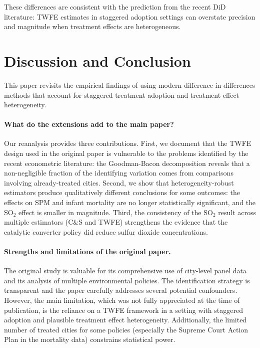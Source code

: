 \documentclass[10pt]{article}
\begin{document}
These differences are consistent with the prediction from the recent DiD literature: TWFE estimates in staggered adoption settings can overstate precision and magnitude when treatment effects are heterogeneous.

\section{Discussion and Conclusion}

This paper revisits the empirical findings of \citet{greenstone2014} using modern difference-in-differences methods that account for staggered treatment adoption and treatment effect heterogeneity.

\paragraph{What do the extensions add to the main paper?} Our reanalysis provides three contributions. First, we document that the TWFE design used in the original paper is vulnerable to the problems identified by the recent econometric literature: the Goodman-Bacon decomposition reveals that a non-negligible fraction of the identifying variation comes from comparisons involving already-treated cities. Second, we show that heterogeneity-robust estimators produce qualitatively different conclusions for some outcomes: the effects on SPM and infant mortality are no longer statistically significant, and the SO$_2$ effect is smaller in magnitude. Third, the consistency of the SO$_2$ result across multiple estimators (C\&S and TWFE) strengthens the evidence that the catalytic converter policy did reduce sulfur dioxide concentrations.

\paragraph{Strengths and limitations of the original paper.} The original study is valuable for its comprehensive use of city-level panel data and its analysis of multiple environmental policies. The identification strategy is transparent and the paper carefully addresses several potential confounders. However, the main limitation, which was not fully appreciated at the time of publication, is the reliance on a TWFE framework in a setting with staggered adoption and plausible treatment effect heterogeneity. Additionally, the limited number of treated cities for some policies (especially the Supreme Court Action Plan in the mortality data) constrains statistical power.
\end{document}
